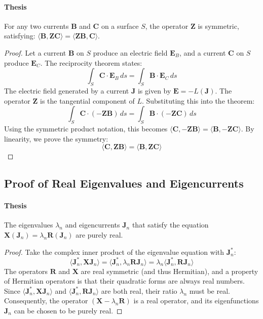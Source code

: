\documentclass[11pt, a4paper]{report}
\begin{document}
\paragraph{Thesis} For any two currents $\mathbf{B}$ and $\mathbf{C}$ on a surface $S$, the operator $\mathbf{Z}$ is symmetric, satisfying: $\langle \mathbf{B}, \mathbf{Z}\mathbf{C} \rangle = \langle \mathbf{Z}\mathbf{B}, \mathbf{C} \rangle$.
\begin{proof}
Let a current $\mathbf{B}$ on $S$ produce an electric field $\mathbf{E}_B$, and a current $\mathbf{C}$ on $S$ produce $\mathbf{E}_C$. The reciprocity theorem states:
\begin{equation}
\int_S \mathbf{C} \cdot \mathbf{E}_B \,ds = \int_S \mathbf{B} \cdot \mathbf{E}_C \,ds
\end{equation}
The electric field generated by a current $\mathbf{J}$ is given by $\mathbf{E} = -L(\mathbf{J})$. The operator $\mathbf{Z}$ is the tangential component of $L$. Substituting this into the theorem:
\begin{equation}
\int_S \mathbf{C} \cdot (-\mathbf{Z}\mathbf{B}) \,ds = \int_S \mathbf{B} \cdot (-\mathbf{Z}\mathbf{C}) \,ds
\end{equation}
Using the symmetric product notation, this becomes $\langle \mathbf{C}, -\mathbf{Z}\mathbf{B} \rangle = \langle \mathbf{B}, -\mathbf{Z}\mathbf{C} \rangle$. By linearity, we prove the symmetry:
\begin{equation}
\langle \mathbf{C}, \mathbf{Z}\mathbf{B} \rangle = \langle \mathbf{B}, \mathbf{Z}\mathbf{C} \rangle
\end{equation}
\end{proof}

\subsection{Proof of Real Eigenvalues and Eigencurrents} \label{ssec:proof_real}
\paragraph{Thesis} The eigenvalues $\lambda_n$ and eigencurrents $\mathbf{J}_n$ that satisfy the equation $\mathbf{X}(\mathbf{J}_n) = \lambda_n \mathbf{R}(\mathbf{J}_n)$ are purely real.
\begin{proof}
Take the complex inner product of the eigenvalue equation with $\mathbf{J}_n^*$:
\begin{equation}
    \langle \mathbf{J}_n^*, \mathbf{X}\mathbf{J}_n \rangle = \langle \mathbf{J}_n^*, \lambda_n \mathbf{R}\mathbf{J}_n \rangle = \lambda_n \langle \mathbf{J}_n^*, \mathbf{R}\mathbf{J}_n \rangle
\end{equation}
The operators $\mathbf{R}$ and $\mathbf{X}$ are real symmetric (and thus Hermitian), and a property of Hermitian operators is that their quadratic forms are always real numbers. Since $\langle \mathbf{J}_n^*, \mathbf{X}\mathbf{J}_n \rangle$ and $\langle \mathbf{J}_n^*, \mathbf{R}\mathbf{J}_n \rangle$ are both real, their ratio $\lambda_n$ must be real. Consequently, the operator $(\mathbf{X} - \lambda_n \mathbf{R})$ is a real operator, and its eigenfunctions $\mathbf{J}_n$ can be chosen to be purely real.
\end{proof}
\end{document}
